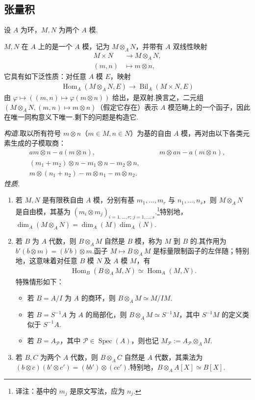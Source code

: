 \subsection{张量积}\label{sec:nt-2-1-5}
设 $A$ 为环，$M,N$ 为两个 $A$ 模.
\begin{definition*}
$M,N$ 在 $A$ 上的是一个 $A$ 模，记为 $M\otimes_A N$，并带有 $A$ 双线性映射
\begin{align*}
M\times N&\longrightarrow M\otimes_A N,\\
(m,n)&\longmapsto m\otimes n,
\end{align*}
它具有如下泛性质：对任意 $A$ 模 $E$，映射
\begin{align*}
\operatorname{Hom}_A(M\otimes_A N,E)\longrightarrow\operatorname{Bil}_A(M\times N,E)
\end{align*}
由 $\varphi\mapsto((m,n)\mapsto\varphi(m\otimes n))$ 给出，是双射.换言之，二元组 $(M\otimes_A N,(m,n)\mapsto m\otimes n)$（假定它存在）表示 $A$ 模范畴上的一个函子，因此在唯一同构意义下唯一.剩下的问题是构造它.
\end{definition*}
\emph{构造.}取以所有符号 $m\otimes n$（$m\in M,n\in N$）为基的自由 $A$ 模，再对由以下各类元素生成的子模取商：
\begin{align*}
am\otimes n-a(m\otimes n),&\qquad m\otimes an-a(m\otimes n),\\
(m_1+m_2)\otimes n-m_1\otimes n-m_2\otimes n,&\\
m\otimes(n_1+n_2)-m\otimes n_1-m\otimes n_2.&
\end{align*}
\emph{性质.}
\begin{enumerate}[label=\roman*)]
\item 若 $M,N$ 是有限秩自由 $A$ 模，分别有基 $m_1,\ldots,m_r$ 与 $n_1,\ldots,n_s$，则 $M\otimes_A N$ 是自由模，其基为 $(m_i\otimes m_j)_{i=1,\ldots,r;\ j=1,\ldots,s}$.\footnote{译注：基中的 $m_j$ 是原文写法，应为 $n_j$.}特别地，$\dim_A(M\otimes_A N)=\dim_A(M)\dim_A(N)$.
\item 若 $B$ 为 $A$ 代数，则 $B\otimes_A M$ 自然是 $B$ 模，称为 $M$ 到 $B$ 的.其作用为 $b'(b\otimes m)=(b'b)\otimes m$.函子 $M\mapsto B\otimes_A M$ 是标量限制函子的左伴随；特别地，这意味着对任意 $B$ 模 $N$ 及 $A$ 模 $M$，有
\begin{align*}
\operatorname{Hom}_B(B\otimes_A M,N)\simeq\operatorname{Hom}_A(M,N).
\end{align*}
特殊情形如下：
\begin{itemize}
\item 若 $B=A/I$ 为 $A$ 的商环，则 $B\otimes_A M\simeq M/IM$.
\item 若 $B=S^{-1}A$ 为 $A$ 的局部化，则 $B\otimes_A M\simeq S^{-1}M$，其中 $S^{-1}M$ 的定义类似于 $S^{-1}A$.
\item 若 $B=A_{\mathcal P}$，其中 $\mathcal P\in\operatorname{Spec}(A)$，则也记 $M_{\mathcal P}:=A_{\mathcal P}\otimes_A M$.
\end{itemize}
\item 若 $B,C$ 为两个 $A$ 代数，则 $B\otimes_A C$ 自然是 $A$ 代数，其乘法为 $(b\otimes c)(b'\otimes c')=(bb')\otimes(cc')$.特别地，$B\otimes_A A[X]\simeq B[X]$.
\end{enumerate}

